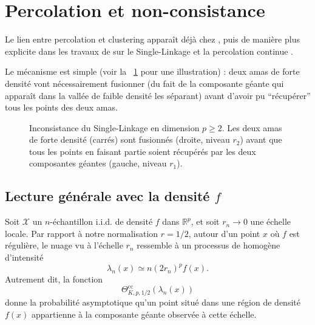 \section{Percolation et non-consistance}

Le lien entre percolation et clustering apparaît déjà chez  \cite{hartigan81}, puis de manière plus explicite dans les travaux de  sur le Single-Linkage et la percolation continue \cite{Penrose1995, penrose2003}. 

Le mécanisme est simple (voir la \Fig~\ref{fig:percolation_2_carres} pour une illustration) : deux amas de forte densité vont nécessairement fusionner (du fait de la composante géante qui apparaît dans la vallée de faible densité les séparant) avant d'avoir pu ``récupérer'' tous les points des deux amas.

\begin{figure}[!ht]
  \centering
  \caption{Inconsistance du Single-Linkage en dimension $p\ge2$. Les deux amas de forte densité (carrés) sont fusionnés (droite, niveau $r_2$) avant que tous les points en faisant partie soient récupérés par les deux composantes géantes (gauche, niveau $r_1$).\label{fig:percolation_2_carres}}
\end{figure}

\subsection{Lecture générale avec la densité $f$}

Soit $\mathcal X$ un $n$-échantillon i.i.d. de densité $f$ dans $\mathbb R^p$, et soit $r_n\to0$ une échelle locale. Par rapport à notre normalisation $r=1/2$, autour d'un point $x$ où $f$ est régulière, le nuage vu à l'échelle $r_n$ ressemble à un processus de  homogène d'intensité
\[
    \lambda_n(x) \simeq n(2r_n)^p f(x).
\]
Autrement dit, la fonction
\[
    \Theta^{\mathrm{cc}}_{K,p,1/2}(\lambda_n(x))
\]
donne la probabilité asymptotique qu'un point situé dans une région de densité $f(x)$ appartienne à la composante géante observée à cette échelle.

